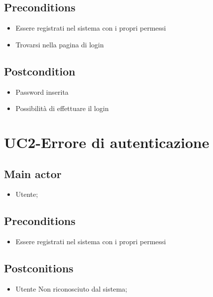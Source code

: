 \documentclass{article}
\begin{document}
     \subsection*{Preconditions} 
        \begin{itemize}
            \item Essere registrati nel sistema con i propri permessi
            \item Trovarsi nella pagina di login
        \end{itemize}
        \subsection*{Postcondition} 
        \begin{itemize}
            \item Password inserita
            \item Possibilità di effettuare il login
        \end{itemize}

\section{UC2-Errore di autenticazione}
    
     \subsection*{Main actor}
         \begin{itemize}
             \item Utente;
         \end{itemize}
     \subsection*{Preconditions} 
        \begin{itemize}
            \item Essere registrati nel sistema con i propri permessi
        \end{itemize}
               
    \subsection*{Postconitions}
        \begin{itemize}
            \item Utente Non riconosciuto dal sistema;
        \end{itemize}
            
\end{document}
